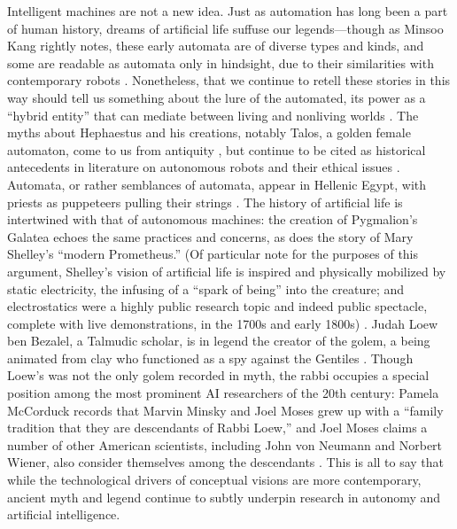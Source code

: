 Intelligent machines are not a new idea. Just as automation has long
been a part of human history, dreams of artificial life suffuse our
legends---though as Minsoo Kang
rightly notes, these early automata are of diverse types and kinds,
and some are readable as automata only in hindsight, due to their
similarities with contemporary robots \cite[p. 15]{kang}.
Nonetheless, that we continue 
to retell these stories in this way should tell us something about the
lure of the automated, its power as a ``hybrid entity'' that can
mediate between living and nonliving worlds \cite[p. 19]{kang}.
The myths about Hephaestus and 
his creations, notably Talos, a golden female automaton, come to us
from antiquity \cite[Ch. 1]{mccorduck}, but continue to be cited as
historical antecedents in 
literature on autonomous robots and their ethical issues \cite[p.
  3]{patrickLin}. Automata, 
or rather semblances of automata, appear in Hellenic Egypt, with
priests as puppeteers pulling their strings \cite[Ch. 1]{mccorduck}. The history of
artificial life is intertwined with that of autonomous machines: the
creation of Pygmalion's Galatea echoes the same practices and
concerns, as does the story of Mary Shelley's ``modern Prometheus.'' (Of
particular note for the purposes of this argument, Shelley's vision of
artificial life is inspired and physically mobilized by static
electricity, the infusing of a ``spark of being'' into the creature; and
electrostatics were a highly public research topic and indeed public
spectacle, complete with live demonstrations, in the 1700s and early
1800s) \cite[p. 44]{shelley}. Judah Loew ben Bezalel, a Talmudic
scholar, is in legend the 
creator of the golem, a being animated from clay who functioned as a
spy against the Gentiles \cite[Ch. 1]{mccorduck}. Though Loew's was not the only golem
recorded in myth, the rabbi occupies a special position among the most
prominent AI researchers of the 20th century: Pamela McCorduck records
that Marvin Minsky and Joel Moses grew up with a ``family tradition
that they are descendants of Rabbi Loew,'' and Joel Moses claims a number of
other American scientists, including John von Neumann and Norbert
Wiener, also consider themselves among the descendants \cite[Ch.
  1]{mccorduck}. This is all 
to say that while the technological drivers of conceptual visions are
more contemporary, ancient myth and legend continue to subtly underpin
research in autonomy and artificial intelligence.

